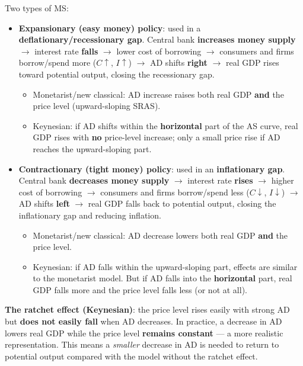 Two types of MS:
\begin{itemize}
  \item \textbf{Expansionary (easy money) policy}: used in a \textbf{deflationary/recessionary gap}. Central bank \textbf{increases money supply} $\to$ interest rate \textbf{falls} $\to$ lower cost of borrowing $\to$ consumers and firms borrow/spend more ($C \uparrow$, $I \uparrow$) $\to$ AD shifts \textbf{right} $\to$ real GDP rises toward potential output, closing the recessionary gap.
  \begin{itemize}
    \item Monetarist/new classical: AD increase raises both real GDP \textbf{and} the price level (upward-sloping SRAS).
    \item Keynesian: if AD shifts within the \textbf{horizontal} part of the AS curve, real GDP rises with \textbf{no} price-level increase; only a small price rise if AD reaches the upward-sloping part.
  \end{itemize}
  \item \textbf{Contractionary (tight money) policy}: used in an \textbf{inflationary gap}. Central bank \textbf{decreases money supply} $\to$ interest rate \textbf{rises} $\to$ higher cost of borrowing $\to$ consumers and firms borrow/spend less ($C \downarrow$, $I \downarrow$) $\to$ AD shifts \textbf{left} $\to$ real GDP falls back to potential output, closing the inflationary gap and reducing inflation.
  \begin{itemize}
    \item Monetarist/new classical: AD decrease lowers both real GDP \textbf{and} the price level.
    \item Keynesian: if AD falls within the upward-sloping part, effects are similar to the monetarist model. But if AD falls into the \textbf{horizontal} part, real GDP falls more and the price level falls less (or not at all).
  \end{itemize}
\end{itemize}
\textbf{The ratchet effect (Keynesian)}: the price level rises easily with strong AD but \textbf{does not easily fall} when AD decreases. In practice, a decrease in AD lowers real GDP while the price level \textbf{remains constant} --- a more realistic representation. This means a \textit{smaller} decrease in AD is needed to return to potential output compared with the model without the ratchet effect.

